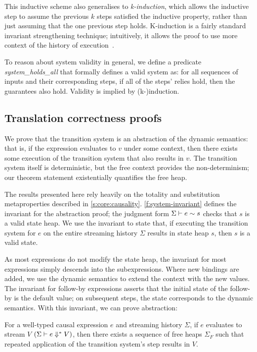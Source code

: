 This inductive scheme also generalises to \emph{k-induction}, which allows the inductive step to assume the previous $k$ steps satisfied the inductive property, rather than just assuming that the one previous step holds.
K-induction is a fairly standard invariant strengthening technique; intuitively, it allows the proof to use more context of the history of execution~\cite{hagen2008scaling,champion2016kind2,gacek2018jkind}.

To reason about system validity in general, we define a predicate \emph{system_holds_all} that formally defines a valid system as: for all sequences of inputs and their corresponding steps, if all of the steps' relies hold, then the guarantees also hold.
Validity is implied by (k-)induction.

\subsection{Translation correctness proofs}
\label{s:transition:proof}

We prove that the transition system is an abstraction of the dynamic semantics: that is, if the expression evaluates to $v$ under some context, then there exists some execution of the transition system that also results in $v$.
The transition system itself is deterministic, but the free context provides the non-determinism; our theorem  statement existentially quantifies the free heap.



The results presented here rely heavily on the totality and substitution metaproperties described in \autoref{s:core:causality}.
\autoref{f:system-invariant} defines the invariant for the abstraction proof; the judgment form $\Sigma \vdash e \sim s$ checks that $s$ is a valid state heap.
We use the invariant to state that, if executing the transition system for $e$ on the entire streaming history $\Sigma$ results in state heap $s$, then $s$ is a valid state.

As most expressions do not modify the state heap, the invariant for most expressions simply descends into the subexpressions.
Where new bindings are added, we use the dynamic semantics to extend the context with the new values.
The invariant for follow-by expressions asserts that the initial state of the follow-by is the default value; on subsequent steps, the state corresponds to the dynamic semantics.
With this invariant, we can prove abstraction:

\begin{theorem}
  For a well-typed causal expression $e$ and streaming history $\Sigma$, if $e$ evaluates to stream $V$ $(\Sigma \vdash e \Downarrow^{*} V)$, then there exists a sequence of free heaps $\Sigma_{F}$ such that repeated application of the transition system's step results in $V$.
\end{theorem}

